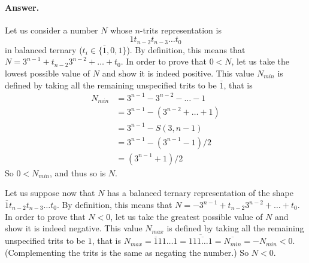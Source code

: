 \paragraph{Answer.} Let us consider a number \(N\) whose
\(n\)\hyp{}trits representation is \[1 t_{n-2} t_{n-3}\dots t_0\] in
balanced ternary (\(t_i \in \{\overline{1}, 0, 1\}\)). By definition,
this means that \(N = 3^{n-1} + t_{n-2} 3^{n-2} + \dots + t_0\). In
order to prove that \(0 < N\), let us take the lowest possible value
of \(N\) and show it is indeed positive. This value
\(N_{\textit{min}}\) is defined by taking all the remaining
unspecified trits to be \(\overline{1}\), that is
\begin{align*}
  N_{\textit{min}} &= 3^{n-1} - 3^{n-2} - \dots - 1\\
               &= 3^{n-1} - (3^{n-2} + \dots + 1)\\
               &= 3^{n-1} - S(3,n-1)\\
               &= 3^{n-1} - (3^{n-1} - 1)/2\\
               &= (3^{n-1} + 1)/2
\end{align*}
So \(0 < N_{\textit{min}}\), and thus so is \(N\).

Let us suppose now that \(N\) has a balanced ternary representation of
the shape \(\overline{1} t_{n-2} t_{n-3}\dots t_0\). By definition,
this means that \(N = -3^{n-1} + t_{n-2} 3^{n-2} + \dots + t_0\). In
order to prove that \(N < 0\), let us take the greatest possible value
of \(N\) and show it is indeed negative. This value
\(N_{\textit{max}}\) is defined by taking all the remaining
unspecified trits to be \(1\), that is \(N_{\textit{max}} =
\overline{1}11\dots1 =
\overline{1\overline{11\dots1}} =
\overline{N_{\textit{min}}} = - N_{\textit{min}} < 0\). (Complementing
the trits is the same as negating the number.) So \(N < 0\).

